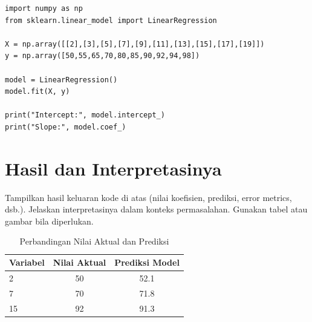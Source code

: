 \documentclass[12pt,a4paper]{article}
\theoremstyle{remark}
\begin{document}
\begin{verbatim}
import numpy as np
from sklearn.linear_model import LinearRegression

X = np.array([[2],[3],[5],[7],[9],[11],[13],[15],[17],[19]])
y = np.array([50,55,65,70,80,85,90,92,94,98])

model = LinearRegression()
model.fit(X, y)

print("Intercept:", model.intercept_)
print("Slope:", model.coef_)
\end{verbatim}

\section{Hasil dan Interpretasinya}
Tampilkan hasil keluaran kode di atas (nilai koefisien, prediksi, error metrics, dsb.).
Jelaskan interpretasinya dalam konteks permasalahan.
Gunakan tabel atau gambar bila diperlukan.

\begin{table}[H]
    \centering
    \begin{tabular}{@{}lcc@{}}
        \toprule
        Variabel & Nilai Aktual & Prediksi Model \\ \midrule
        2        & 50           & 52.1           \\
        7        & 70           & 71.8           \\
        15       & 92           & 91.3           \\ \bottomrule
    \end{tabular}
    \caption{Perbandingan Nilai Aktual dan Prediksi}
\end{table}

\printbibliography[title={Referensi}]
\end{document}
